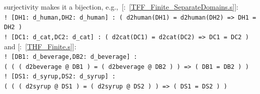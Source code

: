 \documentclass{easychair}
\newcommand{\smalltt}[1]{\small \texttt{#1}}
\newcommand{\example}{{\scriptsize \faFile[regular]}}
\newenvironment{packed_itemize}{
\vspace*{-0.3em}
\begin{itemize}
\setlength{\partopsep}{0pt}
\setlength{\itemsep}{1pt}
\setlength{\parskip}{0pt}
\setlength{\parsep}{0pt}
}{\end{itemize}}
\begin{document}
\begin{packed_itemize}
      surjectivity makes it a bijection, e.g.,~[\example{}:~\ref{TFF_Finite_SeparateDomains.s}]:\\
      \hspace*{0.5cm}\smalltt{! [DH1: d\_human,DH2: d\_human] : ( d2human(DH1) = d2human(DH2) => DH1 = DH2 )}\\
      \hspace*{0.5cm}\smalltt{! [DC1: d\_cat,DC2: d\_cat] : ( d2cat(DC1) = d2cat(DC2) => DC1 = DC2 )}\\
      and [\example{}:~\ref{THF_Finite.s}]:\\
      \hspace*{0.5cm}\smalltt{! [DB1: d\_beverage,DB2: d\_beverage] :}\\
      \hspace*{0.8cm}\smalltt{( ( ( d2beverage @ DB1 ) = ( d2beverage @ DB2 ) ) => ( DB1 = DB2 ) )}\\
      \hspace*{0.5cm}\smalltt{! [DS1: d\_syrup,DS2: d\_syrup] :}\\
      \hspace*{0.8cm}\smalltt{( ( ( d2syrup @ DS1 ) = ( d2syrup @ DS2 ) ) => ( DS1 = DS2 ) )}
\end{packed_itemize}
\end{document}

